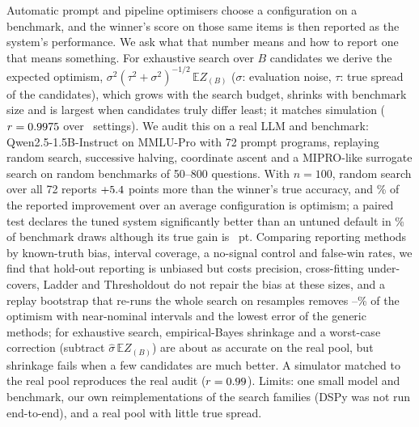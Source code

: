 Automatic prompt and pipeline optimisers choose a configuration on a benchmark, and the winner's score on those same items is then reported as the system's performance. We ask what that number means and how to report one that means something.
For exhaustive search over $B$ candidates we derive the expected optimism, $\sigma^2(\tau^2+\sigma^2)^{-1/2}\,\mathbb{E}Z_{(B)}$ ($\sigma$: evaluation noise, $\tau$: true spread of the candidates), which grows with the search budget, shrinks with benchmark size and is largest when candidates truly differ least; it matches simulation ($r=0.9975$ over \TheoryCells\ settings).
We audit this on a real LLM and benchmark: Qwen2.5-1.5B-Instruct on MMLU-Pro with 72 prompt programs, replaying random search, successive halving, coordinate ascent and a MIPRO-like surrogate search on random benchmarks of 50--800 questions. With $n{=}100$, random search over all 72 reports $+5.4$ points more than the winner's true accuracy, and \FracOptNHund\% of the reported improvement over an average configuration is optimism; a paired test declares the tuned system significantly better than an untuned default in \ClaimNaiveDefNHund\% of benchmark draws although its true gain is \TrueGainNHund\ pt.
Comparing reporting methods by known-truth bias, interval coverage, a no-signal control and false-win rates, we find that hold-out reporting is unbiased but costs precision, cross-fitting under-covers, Ladder and Thresholdout do not repair the bias at these sizes, and a replay bootstrap that re-runs the whole search on resamples removes \BootRemovedMin--\BootRemovedMax\% of the optimism with near-nominal intervals and the lowest error of the generic methods; for exhaustive search, empirical-Bayes shrinkage and a worst-case correction (subtract $\hat\sigma\,\mathbb{E}Z_{(B)}$) are about as accurate on the real pool, but shrinkage fails when a few candidates are much better. A simulator matched to the real pool reproduces the real audit ($r=0.99$). Limits: one small model and benchmark, our own reimplementations of the search families (DSPy was not run end-to-end), and a real pool with little true spread.
